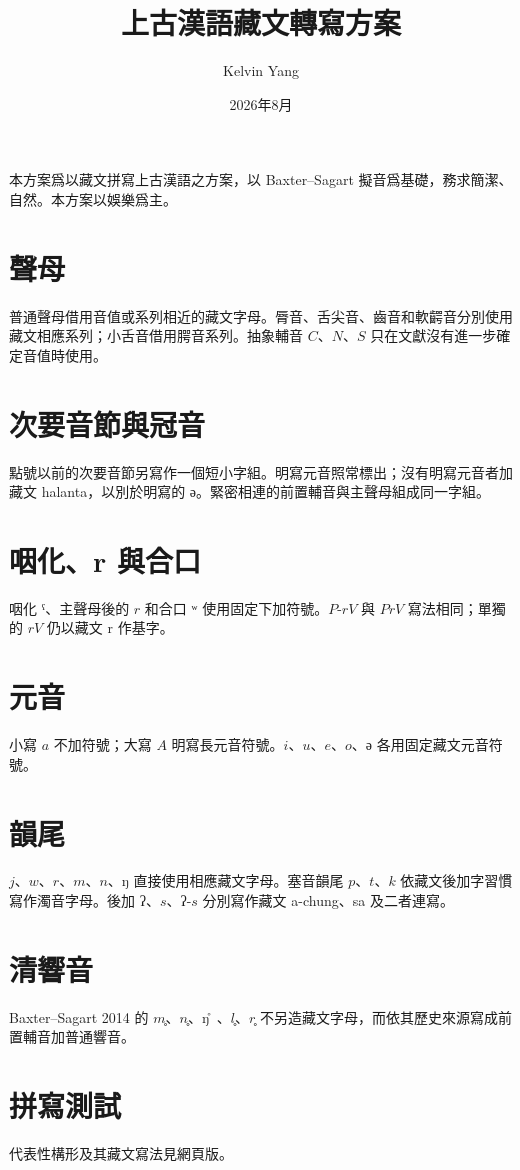 \documentclass[11pt]{article}
\title{上古漢語藏文轉寫方案}
\author{Kelvin Yang}
\date{2026年8月}
\begin{document}
\maketitle

本方案爲以藏文拼寫上古漢語之方案，以 Baxter--Sagart 擬音爲基礎，務求簡潔、自然。本方案以娛樂爲主。

\section{聲母}
普通聲母借用音值或系列相近的藏文字母。脣音、舌尖音、齒音和軟齶音分別使用藏文相應系列；小舌音借用腭音系列。抽象輔音 $C$、$N$、$S$ 只在文獻沒有進一步確定音值時使用。

\section{次要音節與冠音}
點號以前的次要音節另寫作一個短小字組。明寫元音照常標出；沒有明寫元音者加藏文 halanta，以別於明寫的 $ə$。緊密相連的前置輔音與主聲母組成同一字組。

\section{咽化、r 與合口}
咽化 $ˤ$、主聲母後的 $r$ 和合口 $ʷ$ 使用固定下加符號。$P$-$rV$ 與 $PrV$ 寫法相同；單獨的 $rV$ 仍以藏文 r 作基字。

\section{元音}
小寫 $a$ 不加符號；大寫 $A$ 明寫長元音符號。$i$、$u$、$e$、$o$、$ə$ 各用固定藏文元音符號。

\section{韻尾}
$j$、$w$、$r$、$m$、$n$、$ŋ$ 直接使用相應藏文字母。塞音韻尾 $p$、$t$、$k$ 依藏文後加字習慣寫作濁音字母。後加 $ʔ$、$s$、$ʔ$-$s$ 分別寫作藏文 a-chung、sa 及二者連寫。

\section{清響音}
Baxter--Sagart 2014 的 $m̥$、$n̥$、$ŋ̊$、$l̥$、$r̥$ 不另造藏文字母，而依其歷史來源寫成前置輔音加普通響音。

\section{拼寫測試}
代表性構形及其藏文寫法見網頁版。
\end{document}
